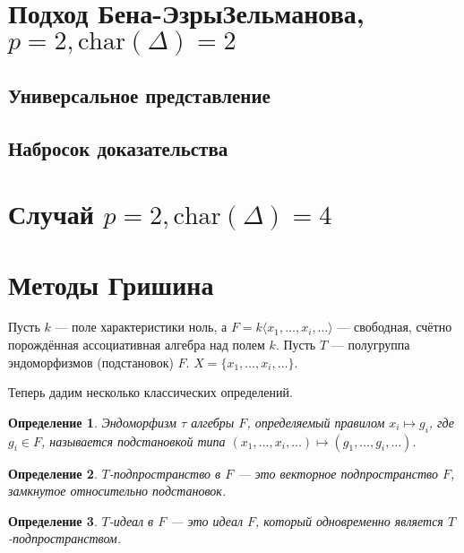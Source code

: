 \documentclass[12pt,a4paper]{article}
\newtheorem{definition}{Определение}[section]
\renewcommand{\char}{\ensuremath{\mathrm{char}}}
\begin{document}
    \section{Подход Бена-Эзры\textemdash Зельманова, $p = 2, \char(\Delta) = 2$}

    \subsection{Универсальное представление}

    \subsection{Набросок доказательства}


    \section{Случай $p=2, \char(\Delta) = 4$}


    \section{Методы Гришина}
    Пусть $k$ — поле характеристики ноль, а $F = k\langle x_1, \ldots, x_i, \ldots \rangle$ — свободная, счётно порождённая ассоциативная алгебра над полем $k$. Пусть $T$ — полугруппа эндоморфизмов (подстановок) $F$. $X = \{ x_1, \ldots, x_i, \ldots \}$.

    Теперь дадим несколько классических определений.

    \vskip 0.1in\noindent
    \begin{definition}
        Эндоморфизм $\tau$ алгебры $F$, определяемый правилом $x_i \mapsto g_i$, где $g_i \in F$, называется подстановкой типа $(x_1, \ldots, x_i, \ldots) \mapsto (g_1, \ldots, g_i, \ldots)$.
    \end{definition}
    \vskip 0.1in\noindent

    \vskip 0.1in\noindent
    \begin{definition}
        $T$-подпространство в $F$ — это векторное подпространство $F$, замкнутое относительно подстановок.
    \end{definition}
    \vskip 0.1in\noindent

    \vskip 0.1in\noindent
    \begin{definition}
        $T$-идеал в $F$ — это идеал $F$, который одновременно является $T$-подпространством.
    \end{definition}
    \vskip 0.1in\noindent
\end{document}
